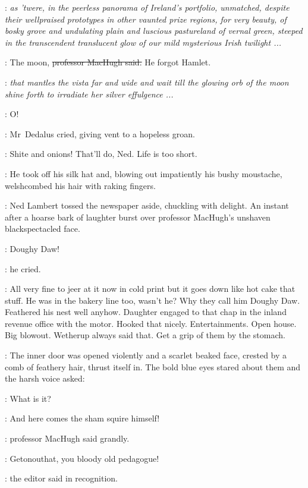 \lambert:
\emph{as 'twere,
in the peerless panorama of Ireland's portfolio,
unmatched,
despite their wellpraised prototypes in other vaunted prize regions,
for very beauty,
of bosky grove and undulating plain and luscious pastureland of vernal green,
steeped in the transcendent translucent glow
of our mild mysterious Irish twilight ...}



\machugh:
The moon,
\sout{professor MacHugh said.}
He forgot Hamlet.

\lambert:
\emph{that mantles the vista far and wide
and wait till the glowing orb of the moon shine forth
to irradiate her silver effulgence ...}

\simon:
O!

:
Mr~Dedalus cried,
giving vent to a hopeless groan.

\simon:
Shite and onions!
That'll do, Ned.
Life is too short.

:
He took off his silk hat
and, blowing out impatiently his bushy moustache,
welshcombed his hair with raking fingers.

:
Ned Lambert tossed the newspaper aside,
chuckling with delight.
An instant after a hoarse bark of laughter
burst over professor MacHugh's unshaven blackspectacled face.

\machugh:
Doughy Daw!

:
he cried.



\BloomInt:
All very fine to jeer at it now in cold print
but it goes down like hot cake that stuff.
He was in the bakery line too, wasn't he?
Why they call him Doughy Daw.
Feathered his nest well anyhow.
Daughter engaged to that chap in the inland revenue office with the motor.
Hooked that nicely.
Entertainments.
Open house.
Big blowout.
Wetherup always said that.
Get a grip of them by the stomach.

:
The inner door was opened violently
and a scarlet beaked face,
crested by a comb of feathery hair,
thrust itself in.
The bold blue eyes stared about them
and the harsh voice asked:

\crawford:
What is it?

\machugh:
And here comes the sham squire himself!

:
professor MacHugh said grandly.

\crawford:
Getonouthat, you bloody old pedagogue!

:
the editor said in recognition.


